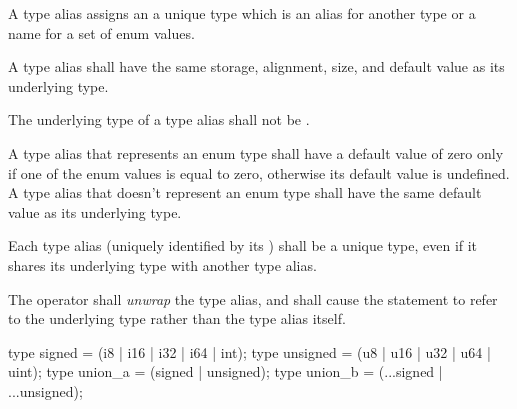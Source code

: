 \specsubsubitem
A type alias assigns an  a unique type which is an
alias for another type or a name for a set of enum values.


\specsubsubitem
A type alias shall have the same storage, alignment, size, and default value as
its underlying type.

\specsubsubitem
The underlying type of a type alias shall not be .

\specsubsubitem
A type alias that represents an enum type shall have a default value of zero
only if one of the enum values is equal to zero, otherwise its default value is
undefined. A type alias that doesn't represent an enum type shall have the same
default value as its underlying type.

\specsubsubitem
Each type alias (uniquely identified by its ) shall be
a unique type, even if it shares its underlying type with another type alias.

\specsubsubitem
The  operator shall \textit{unwrap} the type alias, and shall
cause the statement to refer to the underlying type rather than the type alias
itself.


\begin{codesample}
type signed = (i8 | i16 | i32 | i64 | int);
type unsigned = (u8 | u16 | u32 | u64 | uint);
type union_a = (signed | unsigned);
type union_b = (...signed | ...unsigned);
\end{codesample}
